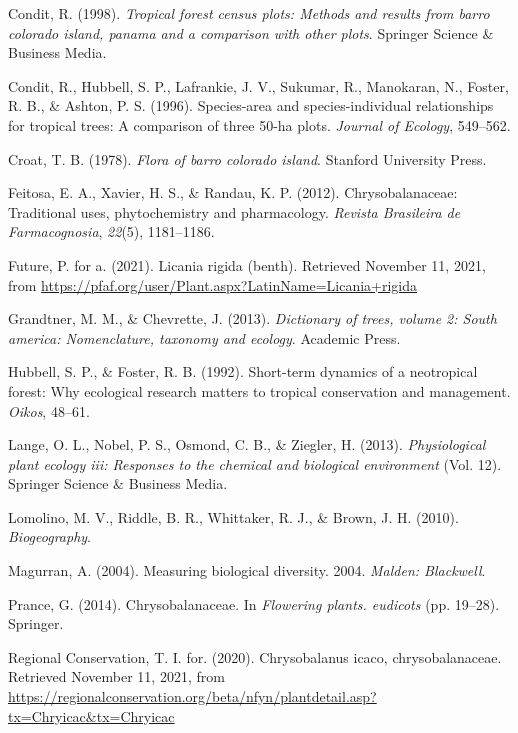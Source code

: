 \documentclass[11pt,]{article}
\begin{document}
\hypertarget{ref-condit1998tropical}{}
Condit, R. (1998). \emph{Tropical forest census plots: Methods and
results from barro colorado island, panama and a comparison with other
plots}. Springer Science \& Business Media.

\hypertarget{ref-condit1996species}{}
Condit, R., Hubbell, S. P., Lafrankie, J. V., Sukumar, R., Manokaran,
N., Foster, R. B., \& Ashton, P. S. (1996). Species-area and
species-individual relationships for tropical trees: A comparison of
three 50-ha plots. \emph{Journal of Ecology}, 549--562.

\hypertarget{ref-croat1978flora}{}
Croat, T. B. (1978). \emph{Flora of barro colorado island}. Stanford
University Press.

\hypertarget{ref-feitosa2012chrysobalanaceae}{}
Feitosa, E. A., Xavier, H. S., \& Randau, K. P. (2012).
Chrysobalanaceae: Traditional uses, phytochemistry and pharmacology.
\emph{Revista Brasileira de Farmacognosia}, \emph{22}(5), 1181--1186.

\hypertarget{ref-PfafLrigida}{}
Future, P. for a. (2021). Licania rigida (benth). Retrieved November 11,
2021, from
\url{https://pfaf.org/user/Plant.aspx?LatinName=Licania+rigida}

\hypertarget{ref-grandtner2013dictionary}{}
Grandtner, M. M., \& Chevrette, J. (2013). \emph{Dictionary of trees,
volume 2: South america: Nomenclature, taxonomy and ecology}. Academic
Press.

\hypertarget{ref-hubbell1992short}{}
Hubbell, S. P., \& Foster, R. B. (1992). Short-term dynamics of a
neotropical forest: Why ecological research matters to tropical
conservation and management. \emph{Oikos}, 48--61.

\hypertarget{ref-lange2013physiological}{}
Lange, O. L., Nobel, P. S., Osmond, C. B., \& Ziegler, H. (2013).
\emph{Physiological plant ecology iii: Responses to the chemical and
biological environment} (Vol. 12). Springer Science \& Business Media.

\hypertarget{ref-lomolino2017biogeography}{}
Lomolino, M. V., Riddle, B. R., Whittaker, R. J., \& Brown, J. H.
(2010). \emph{Biogeography}.

\hypertarget{ref-magurran2004measuring}{}
Magurran, A. (2004). Measuring biological diversity. 2004. \emph{Malden:
Blackwell}.

\hypertarget{ref-prance2014chrysobalanaceae}{}
Prance, G. (2014). Chrysobalanaceae. In \emph{Flowering plants.
eudicots} (pp. 19--28). Springer.

\hypertarget{ref-ircCicaco}{}
Regional Conservation, T. I. for. (2020). Chrysobalanus icaco,
chrysobalanaceae. Retrieved November 11, 2021, from
\url{https://regionalconservation.org/beta/nfyn/plantdetail.asp?tx=Chryicac\&tx=Chryicac}
\end{document}
